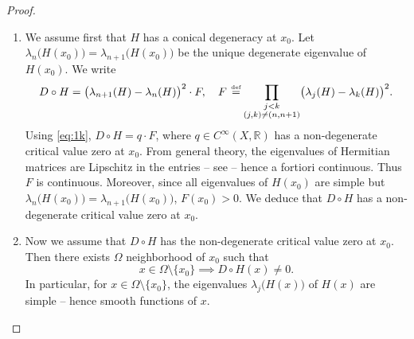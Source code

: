 \documentclass[JEP,XML,SOM,Unicode,NoFloatCountersInSection]{cedram}
\theoremstyle{definition}
\newcommand{\R}{\mathbb{R}}
\newcommand{\de}{\,\mathrel{\stackrel{\makebox[0pt]{\mbox{\normalfont\tiny def}}}{=}}}
\begin{document}
\pagebreak[2]
\skpt
\begin{proof}
\begin{enumerate}
\item
We assume first that $H$ has a conical degeneracy at $x_0$. Let $\lambda_n\bigl( H(x_0) \bigr) = \lambda_{n+1}\bigl( H(x_0) \bigr)$ be the unique degenerate eigenvalue of $H(x_0)$. We write\vspace*{-3pt}
\begin{equation*}
D \circ H = \bigl( \lambda_{n+1}(H) - \lambda_n(H)\bigr)^2 \cdot F, \quad F \de \prod_{\substack{j < k \\ (j,k) \neq (n,n+1)}} \bigl(\lambda_j(H)-\lambda_k(H)\bigr)^2.
\end{equation*}
Using \eqref{eq:1k}, $D \circ H = q \cdot F$, where $q \in C^\infty(X,\R)$ has a non-degenerate critical value zero at $x_0$. From general theory, the eigenvalues of Hermitian matrices are Lipschitz in the entries -- see \cite[Prop.\,6.2]{S10} -- hence a fortiori continuous. Thus $F$ is continuous. Moreover, since all eigenvalues of $H(x_0)$ are simple but $\lambda_n\bigl( H(x_0) \bigr) = \lambda_{n+1}\bigl( H(x_0) \bigr)$, $F(x_0) > 0$. We deduce that $D \circ H$ has a non-degenerate critical value zero at $x_0$.

\item
Now we assume that $D \circ H$ has the non-degenerate critical value zero at $x_0$. Then there exists $\Omega$ neighborhood of $x_0$ such that\vspace*{-3pt}
\begin{equation*}
x \in \Omega \setminus \{ x_0\} \implies D \circ H(x) \neq 0.
\end{equation*}
In particular, for $x \in \Omega \setminus \{ x_0\}$, the eigenvalues $\lambda_j\bigl(H(x)\bigr)$ of $H(x)$ are simple -- hence smooth functions of $x$.


\end{enumerate}
\end{proof}
\end{document}
